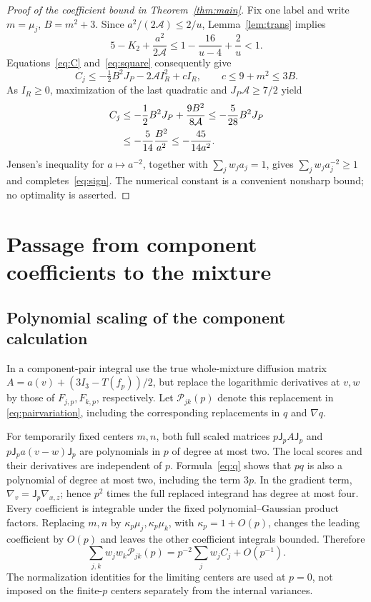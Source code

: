 \documentclass[11pt]{article}
\numberwithin{equation}{section}
\begin{document}
\begin{proof}[Proof of the coefficient bound in Theorem~\ref{thm:main}]
Fix one label and write \(m=\mu_j\), \(B=m^2+3\). Since
\(a^2/(2\mathcal A)\leq2/u\), Lemma~\ref{lem:trans} implies
\begin{equation}\label{eq:cbound}
 5-K_2+\frac{a^2}{2\mathcal A}
 \leq1-\frac{16}{u-4}+\frac2u<1.
\end{equation}
Equations~\eqref{eq:C} and~\eqref{eq:square} consequently give
\[
 C_j\leq-\tfrac12B^2J_P-2\mathcal A I_R^2+cI_R,
 \qquad c\leq9+m^2\leq3B.
\]
As \(I_R\geq0\), maximization of the last quadratic and
\(J_P\mathcal A\geq7/2\) yield
\begin{align}
 C_j&\leq-\frac12B^2J_P+\frac{9B^2}{8\mathcal A}
       \leq-\frac5{28}B^2J_P\notag\\
 &\leq-\frac5{14}\frac{B^2}{a^2}
       \leq-\frac{45}{14a^2}.\label{eq:localbound}
\end{align}
Jensen's inequality for \(a\mapsto a^{-2}\), together with
\(\sum_jw_ja_j=1\), gives \(\sum_jw_ja_j^{-2}\geq1\) and
completes~\eqref{eq:sign}. The numerical constant is a convenient
nonsharp bound; no optimality is asserted.
\end{proof}

\section{Passage from component coefficients to the mixture}\label{sec:transfer}

\subsection{Polynomial scaling of the component calculation}
In a component-pair integral use the true whole-mixture diffusion
matrix \(A=a(v)+(3I_3-T(f_p))/2\), but replace the logarithmic
derivatives at \(v,w\) by those of \(F_{j,p},F_{k,p}\), respectively.
Let \(\mathcal P_{jk}(p)\) denote this replacement in
\eqref{eq:pairvariation}, including the corresponding replacements
in \(q\) and \(\nabla q\).

For temporarily fixed centers \(m,n\), both full scaled matrices
\(p\mathsf J_pA\mathsf J_p\) and
\(p\mathsf J_pa(v-w)\mathsf J_p\) are polynomials in \(p\) of degree
at most two. The local scores and their derivatives are independent of
\(p\). Formula~\eqref{eq:q} shows that \(pq\) is also a polynomial
of degree at most two, including the term \(3p\). In the gradient
term, \(\nabla_v=\mathsf J_p\nabla_{x,z}\); hence \(p^2\) times
the full replaced integrand has degree at most four. Every coefficient
is integrable under the fixed polynomial--Gaussian product factors.
Replacing \(m,n\) by \(\kappa_p\mu_j,\kappa_p\mu_k\), with
\(\kappa_p=1+O(p)\), changes the leading coefficient by \(O(p)\)
and leaves the other coefficient integrals bounded. Therefore
\begin{equation}\label{eq:componentexpansion}
 \sum_{j,k}w_jw_k\mathcal P_{jk}(p)
      =p^{-2}\sum_jw_jC_j+O(p^{-1}).
\end{equation}
The normalization identities for the limiting centers are used at
\(p=0\), not imposed on the finite-\(p\) centers separately from
the internal variances.
\end{document}
